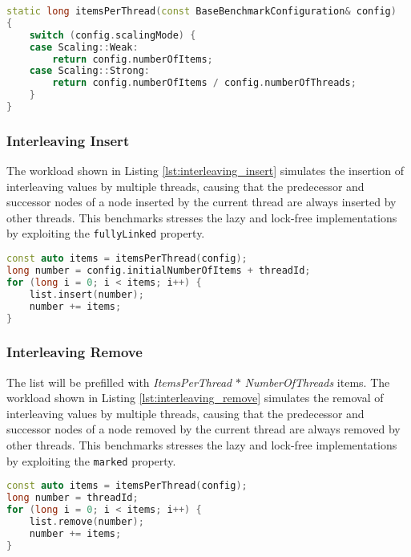 \begin{lstlisting}[language=C++, caption={Items Per Thread depending on the Scaling Mode}, label=lst:itemsPerThread]
static long itemsPerThread(const BaseBenchmarkConfiguration& config)
{
    switch (config.scalingMode) {
    case Scaling::Weak:
        return config.numberOfItems;
    case Scaling::Strong:
        return config.numberOfItems / config.numberOfThreads;
    }
}
\end{lstlisting}

\subsubsection{Interleaving Insert}

The workload shown in Listing \ref{lst:interleaving_insert} simulates the insertion of interleaving values by multiple threads, causing that the predecessor and successor nodes of a node inserted by the current thread are always inserted by other threads. This benchmarks stresses the lazy and lock-free implementations by exploiting the \texttt{fullyLinked} property. 

\begin{lstlisting}[language=C++, caption={Interleaving Insert Workload}, label=lst:interleaving_insert]
const auto items = itemsPerThread(config);
long number = config.initialNumberOfItems + threadId;
for (long i = 0; i < items; i++) {
    list.insert(number);
    number += items;
}
\end{lstlisting}


\subsubsection{Interleaving Remove}

The list will be prefilled with \textit{ItemsPerThread} $*$ \textit{NumberOfThreads} items. The workload shown in Listing \ref{lst:interleaving_remove} simulates the removal of interleaving values by multiple threads, causing that the predecessor and successor nodes of a node removed by the current thread are always removed by other threads. This benchmarks stresses the lazy and lock-free implementations by exploiting the \texttt{marked} property. 

\begin{lstlisting}[language=C++, caption={Interleaving Remove Workload}, label=lst:interleaving_remove]
const auto items = itemsPerThread(config);
long number = threadId;
for (long i = 0; i < items; i++) {
    list.remove(number);
    number += items;
}
\end{lstlisting}


